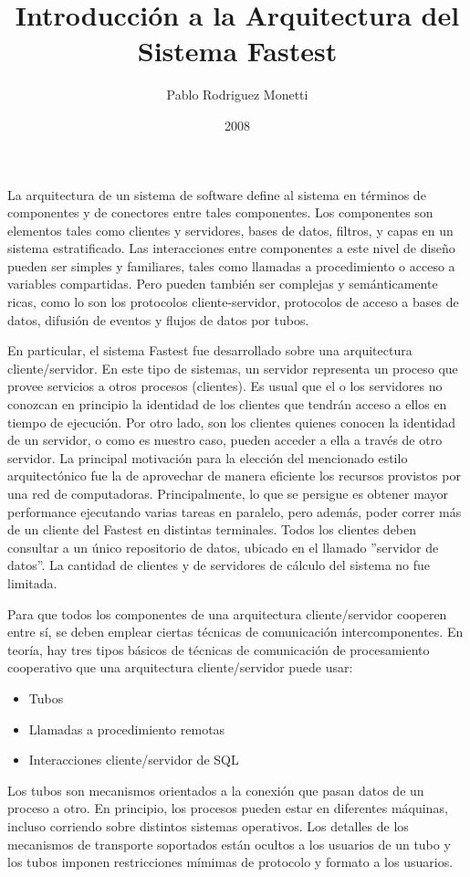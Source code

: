 \documentclass[a4paper,11pt]{article}
\author{Pablo Rodriguez Monetti}
\title{Introducción a la Arquitectura del Sistema Fastest}
\date{2008}
\begin{document}
 \maketitle
La arquitectura de un sistema de software define al sistema en términos de componentes y de conectores entre tales componentes. Los componentes son elementos tales como clientes y servidores, bases de datos, filtros, y capas en un sistema estratificado. Las interacciones entre componentes a este nivel de diseño pueden ser simples y familiares, tales como llamadas a procedimiento o acceso a variables compartidas. Pero pueden también ser complejas y semánticamente ricas, como lo son los protocolos cliente-servidor, protocolos de acceso a bases de datos, difusión de eventos y flujos de datos por tubos.

En particular, el sistema Fastest fue desarrollado sobre una arquitectura cliente/servidor. En este tipo de sistemas, un servidor representa un proceso que provee servicios a otros procesos (clientes). Es usual que el o los servidores no conozcan en principio la identidad de los clientes que tendrán acceso a ellos en tiempo de ejecución. Por otro lado, son los clientes quienes conocen la identidad de un servidor, o como es nuestro caso, pueden acceder a ella a través de otro servidor.
La principal motivación para la elección del mencionado estilo arquitectónico fue la de aprovechar de manera eficiente los recursos provistos por una red de computadoras.
Principalmente, lo que se persigue es obtener mayor performance ejecutando varias tareas en paralelo, pero además, poder correr más de un cliente del Fastest en distintas terminales. Todos los clientes deben consultar a un único repositorio de datos, ubicado en el llamado ''servidor de datos''. La cantidad de clientes y de servidores de cálculo del sistema no fue limitada.

Para que todos los componentes de una arquitectura cliente/servidor cooperen entre sí, se deben emplear ciertas técnicas de comunicación intercomponentes. En teoría, hay tres tipos básicos de técnicas de comunicación de procesamiento cooperativo que una arquitectura cliente/servidor puede usar:
\begin{itemize}
 \item{Tubos}
 \item{Llamadas a procedimiento remotas}
 \item{Interacciones cliente/servidor de SQL} 
\end{itemize}
Los tubos son mecanismos orientados a la conexión que pasan datos de un proceso a otro. En principio, los procesos pueden estar en diferentes máquinas, incluso corriendo sobre distintos sistemas operativos. Los detalles de los mecanismos de transporte soportados están ocultos a los usuarios de un tubo y los tubos imponen restricciones mímimas de protocolo y formato a los usuarios.
\end{document}
